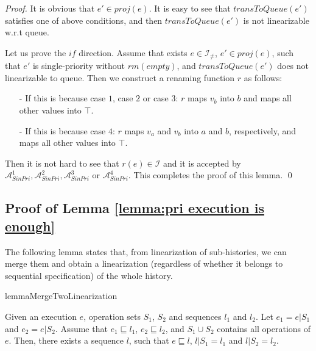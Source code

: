 \begin {proof}
It is obvious that $e' \in \textit{proj}(e)$. It is easy to see that $\textit{transToQueue}(e')$ satisfies one of above conditions, and then $\textit{transToQueue}(e')$ is not linearizable w.r.t queue.

Let us prove the $\textit{if}$ direction. Assume that exists $e \in \mathcal{I}_{\neq}$, $e' \in \textit{proj}(e)$, such that $e'$ is single-priority  without $\textit{rm}(\textit{empty})$, and $\textit{transToQueue}(e')$ does not linearizable to queue. Then we construct a renaming function $r$ as follows:

\begin{itemize}
\setlength{\itemsep}{0.5pt}
\item[-] If this is because case $1$, case $2$ or case $3$: $r$ maps $v_b$ into $b$ and maps all other values into $\top$.

\item[-] If this is because case $4$: $r$ maps $v_a$ and $v_b$ into $a$ and $b$, respectively, and maps all other values into $\top$.
\end{itemize}

Then it is not hard to see that $r(e) \in \mathcal{I}$ and it is accepted by $\mathcal{A}_{\textit{SinPri}}^1, \mathcal{A}_{\textit{SinPri}}^2, \mathcal{A}_{\textit{SinPri}}^3$ or $\mathcal{A}_{\textit{SinPri}}^4$. This completes the proof of this lemma. \qed
\end {proof}




\subsection{Proof of Lemma \ref{lemma:pri execution is enough}}
\label{sec:appendix proof of Lemma pri execution is enough}

The following lemma states that, from linearization of sub-histories, we can merge them and obtain a linearization (regardless of whether it belongs to sequential specification) of the whole history.

\begin{restatable}{lemma}{MergeTwoLinearization}
\label{lemma:merge two linearization}

Given an execution $e$, operation sets $S_1$, $S_2$ and sequences $l_1$ and $l_2$. Let $e_1 = e \vert{S_1}$ and $e_2 = e \vert{S_2}$. Assume that $e_1 \sqsubseteq l_1$, $e_2 \sqsubseteq l_2$, and $S_1 \cup S_2$ contains all operations of $e$. Then, there exists a sequence $l$, such that $e \sqsubseteq l$, $l \vert{S_1} = l_1$ and $l \vert{S_2} = l_2$.
\end{restatable}

